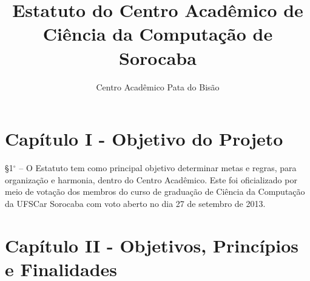 \documentclass[12pt]{article}
\title{Estatuto do Centro Acadêmico de Ciência da Computação de Sorocaba}
\author{Centro Acadêmico Pata do Bisão}
\begin{document}

\section{Capítulo I - Objetivo do Projeto}
    \S 1$^{\circ}$ -- O Estatuto tem como principal objetivo determinar metas e
    regras, para organização e harmonia, dentro do Centro Acadêmico. Este foi
    oficializado por meio de votação dos membros do curso de graduação de
    Ciência da Computação da UFSCar Sorocaba com voto aberto no dia 27 de
    setembro de 2013.

\section{Capítulo II - Objetivos, Princípios e Finalidades}
\end{document}

